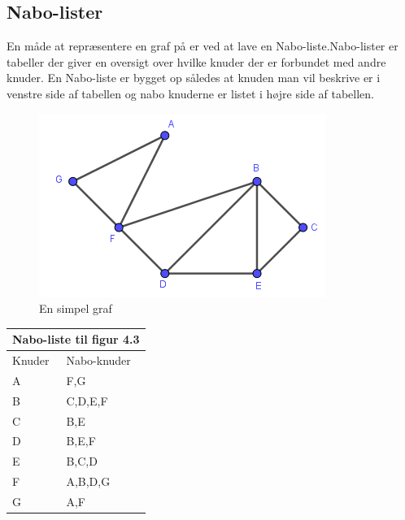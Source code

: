 \subsection{Nabo-lister}
En måde at repræsentere en graf på er ved at lave en Nabo-liste.Nabo-lister er tabeller der giver en oversigt over hvilke knuder der er forbundet med andre knuder. En Nabo-liste er bygget op således at knuden man vil beskrive er i venstre side af tabellen og nabo knuderne er listet i højre side af tabellen. 

\begin{exmp}
	\begin{figure}
	\centering
	\includegraphics[scale=0.5]{fig/img/Nabolisteeks1}
	\caption{En simpel graf}
	\end{figure}
\begin{center}
	\begin{tabular}{ |p{4cm}||p{3cm}|}
	 	\hline
 		\multicolumn{2}{|c|}{Nabo-liste til figur 4.3} \\
 		\hline
 		Knuder & Nabo-knuder\\
 		\hline
 		A & F,G \\
		B & C,D,E,F \\
		C & B,E \\
		D & B,E,F \\
		E & B,C,D \\
		F & A,B,D,G \\
		G & A,F \\
 	\hline
	\end{tabular}
\end{center}
\end{exmp}